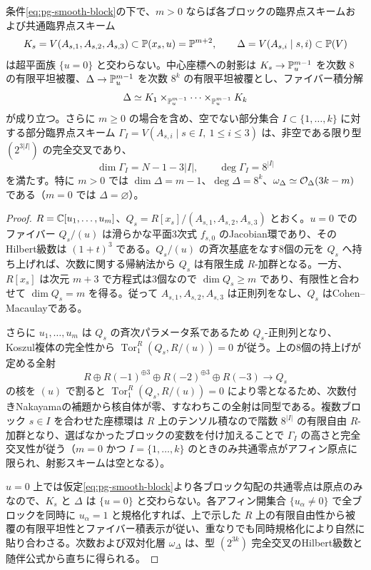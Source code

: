 \begin{lemma}\label{lem:pg-critical-cover}
条件\eqref{eq:pg-smooth-block}の下で、$m>0$ ならば各ブロックの臨界点スキームおよび共通臨界点スキーム
\begin{equation}
K_s=V(A_{s,1},A_{s,2},A_{s,3})\subset\mathbb P(x_s,u)=\mathbb P^{m+2},\qquad
\Delta=V(A_{s,i}\mid s,i)\subset\mathbb P(V)
\end{equation}
は超平面族 $\{u=0\}$ と交わらない。中心座標への射影は $K_s\to\mathbb P_u^{m-1}$ を次数 $8$ の有限平坦被覆、$\Delta\to\mathbb P_u^{m-1}$ を次数 $8^k$ の有限平坦被覆とし、ファイバー積分解
\[
  \Delta\simeq K_1\times_{\mathbb P_u^{m-1}}\cdots\times_{\mathbb P_u^{m-1}}K_k
\]
が成り立つ。さらに $m\geq0$ の場合を含め、空でない部分集合 $I\subset\{1,\ldots,k\}$ に対する部分臨界点スキーム $\Gamma_I=V(A_{s,i}\mid s\in I,\ 1\leq i\leq3)$ は、非空である限り型 $(2^{3|I|})$ の完全交叉であり、
\begin{equation}
\dim\Gamma_I=N-1-3|I|,\qquad\deg\Gamma_I=8^{|I|}
\end{equation}
を満たす。特に $m>0$ では $\dim\Delta=m-1$、$\deg\Delta=8^k$、$\omega_\Delta\simeq\mathcal O_\Delta(3k-m)$ である（$m=0$ では $\Delta=\varnothing$）。
\end{lemma}
\begin{proof}
$R=\mathbb C[u_1,\ldots,u_m]$、$Q_s=R[x_s]/(A_{s,1},A_{s,2},A_{s,3})$ とおく。$u=0$ でのファイバー $Q_s/(u)$ は滑らかな平面3次式 $f_{s,0}$ のJacobian環であり、そのHilbert級数は $(1+t)^3$ である。$Q_s/(u)$ の斉次基底をなす8個の元を $Q_s$ へ持ち上げれば、次数に関する帰納法から $Q_s$ は有限生成 $R$-加群となる。一方、$R[x_s]$ は次元 $m+3$ で方程式は3個なので $\dim Q_s\ge m$ であり、有限性と合わせて $\dim Q_s=m$ を得る。従って $A_{s,1},A_{s,2},A_{s,3}$ は正則列をなし、$Q_s$ はCohen--Macaulayである。

さらに $u_1,\ldots,u_m$ は $Q_s$ の斉次パラメータ系であるため $Q_s$-正則列となり、Koszul複体の完全性から $\operatorname{Tor}_1^R(Q_s,R/(u))=0$ が従う。上の8個の持上げが定める全射
\begin{equation}
R\oplus R(-1)^{\oplus3}\oplus R(-2)^{\oplus3}\oplus R(-3)\longrightarrow Q_s
\end{equation}
の核を $(u)$ で割ると $\operatorname{Tor}_1^R(Q_s,R/(u))=0$ により零となるため、次数付きNakayamaの補題から核自体が零、すなわちこの全射は同型である。複数ブロック $s\in I$ を合わせた座標環は $R$ 上のテンソル積なので階数 $8^{|I|}$ の有限自由 $R$-加群となり、選ばなかったブロックの変数を付け加えることで $\Gamma_I$ の高さと完全交叉性が従う（$m=0$ かつ $I=\{1,\ldots,k\}$ のときのみ共通零点がアフィン原点に限られ、射影スキームは空となる）。

$u=0$ 上では仮定\eqref{eq:pg-smooth-block}より各ブロック勾配の共通零点は原点のみなので、$K_s$ と $\Delta$ は $\{u=0\}$ と交わらない。各アフィン開集合 $\{u_\alpha\ne0\}$ で全ブロックを同時に $u_\alpha=1$ と規格化すれば、上で示した $R$ 上の有限自由性から被覆の有限平坦性とファイバー積表示が従い、重なりでも同時規格化により自然に貼り合わさる。次数および双対化層 $\omega_\Delta$ は、型 $(2^{3k})$ 完全交叉のHilbert級数と随伴公式から直ちに得られる。
\end{proof}

